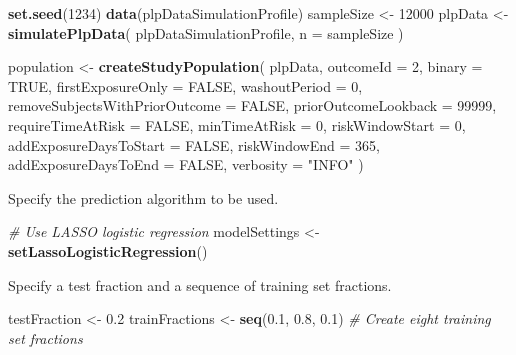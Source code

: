 \documentclass[]{article}
\newenvironment{Shaded}{\begin{snugshade}}{\end{snugshade}}
\newcommand{\KeywordTok}[1]{\textcolor[rgb]{0.13,0.29,0.53}{\textbf{#1}}}
\newcommand{\DataTypeTok}[1]{\textcolor[rgb]{0.13,0.29,0.53}{#1}}
\newcommand{\DecValTok}[1]{\textcolor[rgb]{0.00,0.00,0.81}{#1}}
\newcommand{\FloatTok}[1]{\textcolor[rgb]{0.00,0.00,0.81}{#1}}
\newcommand{\StringTok}[1]{\textcolor[rgb]{0.31,0.60,0.02}{#1}}
\newcommand{\CommentTok}[1]{\textcolor[rgb]{0.56,0.35,0.01}{\textit{#1}}}
\newcommand{\OtherTok}[1]{\textcolor[rgb]{0.56,0.35,0.01}{#1}}
\newcommand{\NormalTok}[1]{#1}
\begin{document}
\begin{Shaded}
\begin{Highlighting}[]
\KeywordTok{set.seed}\NormalTok{(}\DecValTok{1234}\NormalTok{)}
\KeywordTok{data}\NormalTok{(plpDataSimulationProfile)}
\NormalTok{sampleSize <-}\StringTok{ }\DecValTok{12000}
\NormalTok{plpData <-}\StringTok{ }\KeywordTok{simulatePlpData}\NormalTok{(}
\NormalTok{  plpDataSimulationProfile,}
  \DataTypeTok{n =}\NormalTok{ sampleSize}
\NormalTok{)}

\NormalTok{population <-}\StringTok{ }\KeywordTok{createStudyPopulation}\NormalTok{(}
\NormalTok{  plpData,}
  \DataTypeTok{outcomeId =} \DecValTok{2}\NormalTok{,}
  \DataTypeTok{binary =} \OtherTok{TRUE}\NormalTok{,}
  \DataTypeTok{firstExposureOnly =} \OtherTok{FALSE}\NormalTok{,}
  \DataTypeTok{washoutPeriod =} \DecValTok{0}\NormalTok{,}
  \DataTypeTok{removeSubjectsWithPriorOutcome =} \OtherTok{FALSE}\NormalTok{,}
  \DataTypeTok{priorOutcomeLookback =} \DecValTok{99999}\NormalTok{,}
  \DataTypeTok{requireTimeAtRisk =} \OtherTok{FALSE}\NormalTok{,}
  \DataTypeTok{minTimeAtRisk =} \DecValTok{0}\NormalTok{,}
  \DataTypeTok{riskWindowStart =} \DecValTok{0}\NormalTok{,}
  \DataTypeTok{addExposureDaysToStart =} \OtherTok{FALSE}\NormalTok{,}
  \DataTypeTok{riskWindowEnd =} \DecValTok{365}\NormalTok{,}
  \DataTypeTok{addExposureDaysToEnd =} \OtherTok{FALSE}\NormalTok{,}
  \DataTypeTok{verbosity =} \StringTok{"INFO"}
\NormalTok{)}
\end{Highlighting}
\end{Shaded}

Specify the prediction algorithm to be used.

\begin{Shaded}
\begin{Highlighting}[]
\CommentTok{# Use LASSO logistic regression}
\NormalTok{modelSettings <-}\StringTok{ }\KeywordTok{setLassoLogisticRegression}\NormalTok{()}
\end{Highlighting}
\end{Shaded}

Specify a test fraction and a sequence of training set fractions.

\begin{Shaded}
\begin{Highlighting}[]
\NormalTok{testFraction <-}\StringTok{ }\FloatTok{0.2}
\NormalTok{trainFractions <-}\StringTok{ }\KeywordTok{seq}\NormalTok{(}\FloatTok{0.1}\NormalTok{, }\FloatTok{0.8}\NormalTok{, }\FloatTok{0.1}\NormalTok{) }\CommentTok{# Create eight training set fractions}
\end{Highlighting}
\end{Shaded}
\end{document}
